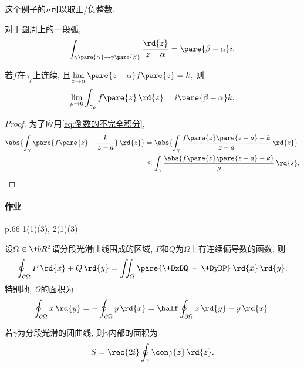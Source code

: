 \documentclass[../ComplexVariable.tex]{subfiles}
\begin{document}
\begin{remark}
    这个例子的$n$可以取正/负整数.
\end{remark}
\begin{remark}
    对于圆周上的一段弧,
    \begin{equation}
        \label{eq:倒数的不完全积分}
        \int_{\gamma\pare{\alpha}\rightarrow\gamma\pare{\beta}} \frac{\rd{z}}{z-\alpha} = \pare{\beta - \alpha} i. 
    \end{equation}
\end{remark}
\begin{sample}
    \begin{ex}
        若$f$在$\gamma_\rho$上连续, 且$\displaystyle \lim_{z\rightarrow \alpha} \pare{z-\alpha}f\pare{z} = k$, 则
        \[ \lim_{\rho\rightarrow 0} \int_{\gamma_\rho} f\pare{z}\,\rd{z} = i\pare{\beta - \alpha} k. \]
    \end{ex}
    \begin{proof}
        为了应用\eqref{eq:倒数的不完全积分},
        \begin{align*}
            \abs{\int_\gamma \pare{f\pare{z} - \frac{k}{z-a}}\,\rd{z}} &= \abs{\int_\gamma \frac{f\pare{z}\pare{z-a} - k}{z-a}\,\rd{z}} \\
            &\le \int_\gamma \frac{\abs{f\pare{z}\pare{z-a} - k}}{\rho}\,\rd{s}. \qedhere
        \end{align*}
    \end{proof}
\end{sample}



\paragraph{作业} %
\label{par:作业}

p.66 1(1)(3), 2(1)(3)


\begin{theorem}[Green公式]
    设$\Omega\in \+bR^2$谓分段光滑曲线围成的区域, $P$和$Q$为$\Omega$上有连续偏导数的函数, 则
    \[ \oint_{\partial \Omega} P\,\rd{x} + Q\,\rd{y} = \iint_\Omega \pare{\+DxDQ - \+DyDP}\,\rd{x}\,\rd{y}. \]
    特别地, $\Omega$的面积为
    \[ \oint_{\partial\Omega} x\,\rd{y} = -\oint_{\partial\Omega}y\,\rd{x} = \half \oint_{\partial \Omega} x\,\rd{y} - y\,\rd{x}. \]
\end{theorem}
\begin{corollary}
    若$\gamma$为分段光滑的闭曲线, 则$\gamma$内部的面积为
    \[ S = \rec{2i}\oint_\gamma\conj{z}\,\rd{z}. \]
\end{corollary}
\end{document}
